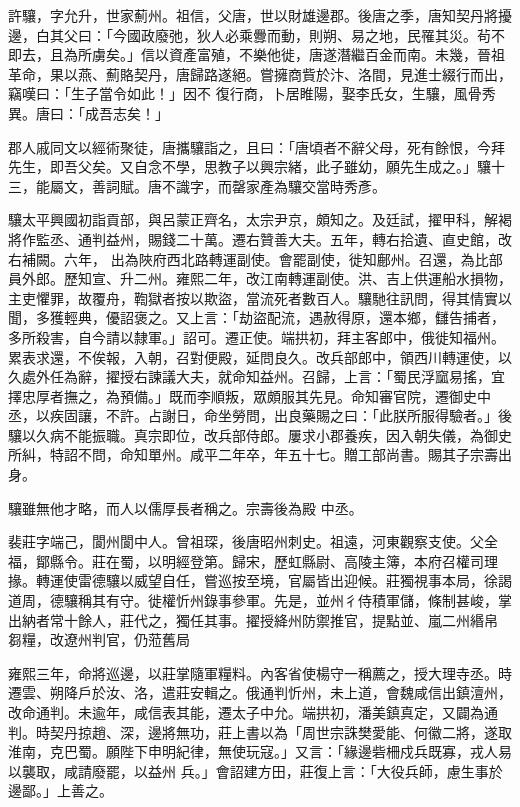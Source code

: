 \begin{pinyinscope}
 許驤，字允升，世家薊州。祖信，父唐，世以財雄邊郡。後唐之季，唐知契丹將擾邊，白其父曰：「今國政廢弛，狄人必乘釁而動，則朔、易之地，民罹其災。茍不即去，且為所虜矣。」信以資產富殖，不樂他徙，唐遂潛繼百金而南。未幾，晉祖革命，果以燕、薊賂契丹，唐歸路遂絕。嘗擁商貲於汴、洛間，見進士綴行而出，竊嘆曰：「生子當令如此！」因不
 復行商，卜居睢陽，娶李氏女，生驤，風骨秀異。唐曰：「成吾志矣！」



 郡人戚同文以經術聚徒，唐攜驤詣之，且曰：「唐頃者不辭父母，死有餘恨，今拜先生，即吾父矣。又自念不學，思教子以興宗緒，此子雖幼，願先生成之。」驤十三，能屬文，善詞賦。唐不識字，而罄家產為驤交當時秀彥。



 驤太平興國初詣貢部，與呂蒙正齊名，太宗尹京，頗知之。及廷試，擢甲科，解褐將作監丞、通判益州，賜錢二十萬。遷右贊善大夫。五年，轉右拾遺、直史館，改右補闕。六年，
 出為陜府西北路轉運副使。會罷副使，徙知鄜州。召還，為比部員外郎。歷知宣、升二州。雍熙二年，改江南轉運副使。洪、吉上供運船水損物，主吏懼罪，故覆舟，鞫獄者按以欺盜，當流死者數百人。驤馳往訊問，得其情實以聞，多獲輕典，優詔褒之。又上言：「劫盜配流，遇赦得原，還本鄉，讎告捕者，多所殺害，自今請以隸軍。」詔可。遷正使。端拱初，拜主客郎中，俄徙知福州。累表求還，不俟報，入朝，召對便殿，延問良久。改兵部郎中，領西川轉運使，以
 久處外任為辭，擢授右諫議大夫，就命知益州。召歸，上言：「蜀民浮窳易搖，宜擇忠厚者撫之，為預備。」既而李順叛，眾頗服其先見。命知審官院，遷御史中丞，以疾固讓，不許。占謝日，命坐勞問，出良藥賜之曰：「此朕所服得驗者。」後驤以久病不能振職。真宗即位，改兵部侍郎。屢求小郡養疾，因入朝失儀，為御史所糾，特詔不問，命知單州。咸平二年卒，年五十七。贈工部尚書。賜其子宗壽出身。



 驤雖無他才略，而人以儒厚長者稱之。宗壽後為殿
 中丞。



 裴莊字端己，閬州閬中人。曾祖琛，後唐昭州刺史。祖遠，河東觀察支使。父全福，鄮縣令。莊在蜀，以明經登第。歸宋，歷虹縣尉、高陵主簿，本府召權司理掾。轉運使雷德驤以威望自任，嘗巡按至境，官屬皆出迎候。莊獨視事本局，徐謁道周，德驤稱其有守。徙權忻州錄事參軍。先是，並州彳侍積軍儲，條制甚峻，掌出納者常十餘人，莊代之，獨任其事。擢授絳州防禦推官，提點並、嵐二州緡帛
 芻糧，改遼州判官，仍蒞舊局



 雍熙三年，命將巡邊，以莊掌隨軍糧料。內客省使楊守一稱薦之，授大理寺丞。時遷雲、朔降戶於汝、洛，遣莊安輯之。俄通判忻州，未上道，會魏咸信出鎮澶州，改命通判。未逾年，咸信表其能，遷太子中允。端拱初，潘美鎮真定，又闢為通判。時契丹掠趙、深，邊將無功，莊上書以為「周世宗誅樊愛能、何徽二將，遂取淮南，克巴蜀。願陛下申明紀律，無使玩寇。」又言：「緣邊砦柵戍兵既寡，戎人易以襲取，咸請廢罷，以益州
 兵。」會詔建方田，莊復上言：「大役兵師，慮生事於邊鄙。」上善之。




\end{pinyinscope}
